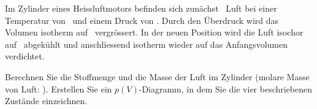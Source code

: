 Im Zylinder eines Heissluftmotors befinden sich zunächst \VEiO\ Luft bei einer Temperatur von \thEiO\ und einem Druck von \pEiO. Durch den Überdruck wird das Volumen isotherm auf \VZwO\ vergrössert. In der neuen Position wird die Luft isochor auf \thDrO\ abgekühlt und anschliessend isotherm wieder auf das Anfangsvolumen verdichtet.
\begin{abcliste}
\abc Berechnen Sie die Stoffmenge und die Masse der Luft im Zylinder (molare Masse von Luft: \MLuO).
\abc Erstellen Sie ein $p(V)$-Diagramm, in dem Sie die vier beschriebenen Zustände einzeichnen.
\end{abcliste}
